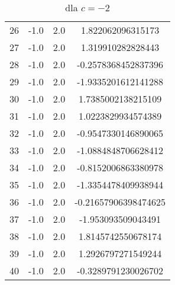 \documentclass{article}
\begin{document}
\begin{center}
\begin{table}[h]
\begin{tabular}{|c|c|c|c|}
        26 & -1.0 & 2.0 & 1.822062096315173 \\
        27 & -1.0 & 2.0 & 1.319910282828443 \\
        28 & -1.0 & 2.0 & -0.2578368452837396 \\
        29 & -1.0 & 2.0 & -1.9335201612141288 \\
        30 & -1.0 & 2.0 & 1.7385002138215109 \\
        31 & -1.0 & 2.0 & 1.0223829934574389 \\
        32 & -1.0 & 2.0 & -0.9547330146890065 \\
        33 & -1.0 & 2.0 & -1.0884848706628412 \\
        34 & -1.0 & 2.0 & -0.8152006863380978 \\
        35 & -1.0 & 2.0 & -1.3354478409938944 \\
        36 & -1.0 & 2.0 & -0.21657906398474625 \\
        37 & -1.0 & 2.0 & -1.953093509043491 \\
        38 & -1.0 & 2.0 & 1.8145742550678174 \\
        39 & -1.0 & 2.0 & 1.2926797271549244 \\
        40 & -1.0 & 2.0 & -0.3289791230026702 \\
        \hline
    \end{tabular}
    \caption{dla $c=-2$}
    \end{table}
    \newpage


\end{center}
\end{document}
